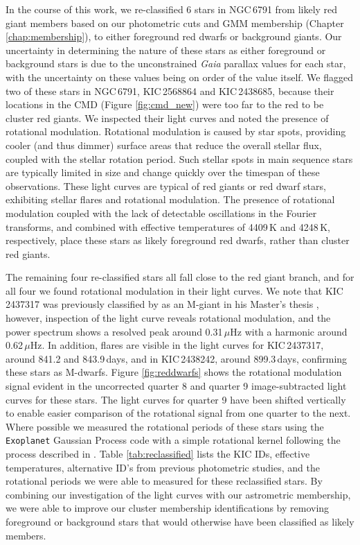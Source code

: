 In the course of this work, we re-classified 6 stars in NGC\,6791 from likely red giant members based on our photometric cuts and GMM membership (Chapter \ref{chap:membership}), to either foreground red dwarfs or background giants. Our uncertainty in determining the nature of these stars as either foreground or background stars is due to the unconstrained {\em Gaia} parallax values for each star, with the uncertainty on these values being on order of the value itself. We flagged two of these stars in NGC\,6791, KIC\,2568864 and KIC\,2438685, because their locations in the CMD (Figure \ref{fig:cmd_new}) were too far to the red to be cluster red giants. We inspected their light curves and noted the presence of rotational modulation. Rotational modulation is caused by star spots, providing cooler (and thus dimmer) surface areas that reduce the overall stellar flux, coupled with the stellar rotation period. Such stellar spots in main sequence stars are typically limited in size and change quickly over the timespan of these observations. These light curves are typical of red giants or red dwarf stars, exhibiting stellar flares and rotational modulation. The presence of rotational modulation coupled with the lack of detectable oscillations in the Fourier transforms, and combined with effective temperatures of 4409\,K and 4248\,K, respectively, place these stars as likely foreground red dwarfs, rather than cluster red giants.

The remaining four re-classified stars all fall close to the red giant branch, and for all four we found rotational modulation in their light curves. We note that KIC\,2437317 was previously classified by \cite{bellamy_new_2015} as an M-giant in his Master's thesis \citep{bellamy_using_2015}, however, inspection of the light curve reveals rotational modulation, and the power spectrum shows a resolved peak around 0.31\,$\mu$Hz with a harmonic around 0.62\,$\mu$Hz. In addition, flares are visible in the light curves for KIC\,2437317, around 841.2 and 843.9\,days, and in KIC\,2438242, around 899.3\,days, confirming these stars as M-dwarfs. Figure \ref{fig:reddwarfs} shows the rotational modulation signal evident in the uncorrected quarter 8 and quarter 9 image-subtracted light curves for these stars. The light curves for quarter 9 have been shifted vertically to enable easier comparison of the rotational signal from one quarter to the next. Where possible we measured the rotational periods of these stars using the \texttt{Exoplanet} Gaussian Process code with a simple rotational kernel following the process described in \cite{foreman-mackey_fast_2017}. Table \ref{tab:reclassified} lists the KIC IDs, effective temperatures, alternative ID's from previous photometric studies, and the rotational periods we were able to measured for these reclassified stars. By combining our investigation of the \Kepler{} light curves with our astrometric membership, we were able to improve our cluster membership identifications by removing foreground or background stars that would otherwise have been classified as likely members.

